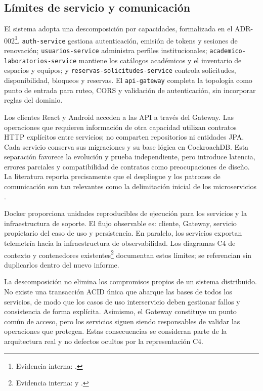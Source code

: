 \subsection{Límites de servicio y comunicación}
\label{subsec:limites-servicio}

El sistema adopta una descomposición por capacidades, formalizada en el
ADR-002\footnote{Evidencia interna: .}.
\texttt{auth-service} gestiona autenticación, emisión de tokens y sesiones de
renovación; \texttt{usuarios-service} administra perfiles institucionales;
\texttt{academico-laboratorios-service} mantiene los catálogos académicos y el
inventario de espacios y equipos; y \texttt{reservas-solicitudes-service}
controla solicitudes, disponibilidad, bloqueos y reservas. El
\texttt{api-gateway} completa la topología como punto de entrada para ruteo,
CORS y validación de autenticación, sin incorporar reglas del dominio.

Los clientes React y Android acceden a las API a través del Gateway. Las
operaciones que requieren información de otra capacidad utilizan contratos HTTP
explícitos entre servicios; no comparten repositorios ni entidades JPA. Cada
servicio conserva sus migraciones y su base lógica en CockroachDB. Esta
separación favorece la evolución y prueba independiente, pero introduce latencia,
errores parciales y compatibilidad de contratos como preocupaciones de diseño.
La literatura reporta precisamente que el despliegue y los patrones de
comunicación son tan relevantes como la delimitación inicial de los
microservicios \cite{aksakalli2021deployment}.

Docker proporciona unidades reproducibles de ejecución para los servicios y la
infraestructura de soporte. El flujo observable es: cliente, Gateway, servicio
propietario del caso de uso y persistencia. En paralelo, los servicios exportan
telemetría hacia la infraestructura de observabilidad. Los diagramas C4 de
contexto y contenedores existentes\footnote{Evidencia interna:
 y
.} documentan estos límites; se referencian sin
duplicarlos dentro del nuevo informe.

La descomposición no elimina los compromisos propios de un sistema distribuido.
No existe una transacción ACID única que abarque las bases de todos los
servicios, de modo que los casos de uso interservicio deben gestionar fallos y
consistencia de forma explícita. Asimismo, el Gateway constituye un punto común
de acceso, pero los servicios siguen siendo responsables de validar las
operaciones que protegen. Estas consecuencias se consideran parte de la
arquitectura real y no defectos ocultos por la representación C4.

